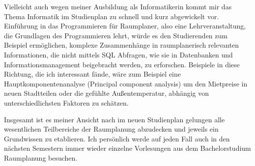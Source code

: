 \documentclass[]{article}
\begin{document}
Vielleicht auch wegen meiner Ausbildung als Informatikerin kommt mir das Thema Informatik im Studienplan zu schnell und kurz abgewickelt vor. Einführung in das Programmieren für Raumplaner, also eine Lehrveranstaltung, die Grundlagen des Programmieren lehrt, würde es den Studierenden zum Beispiel ermöglichen, komplexe Zusammenhänge in raumplanerisch relevanten Informationen, die nicht mittels SQL Abfragen, wie sie in Datenbanken und Informationsmanagement beigebracht werden, zu erforschen. Beispiele in diese Richtung, die ich interessant fände, wäre zum Beispiel eine Hauptkomponentenanalyse (Principal component analysis) um den Mietpreise in neuen Stadtteilen oder die gefühlte Außentemperatur, abhängig von unterschiedlichsten Faktoren zu schätzen.

Insgesamt ist es meiner Ansicht nach im neuen Studienplan gelungen alle wesentlichen Teilbereiche der Raumplanung abzudecken und jeweils ein Grundwissen zu etablieren. Ich persönlich werde auf jeden Fall auch in den nächsten Semestern immer wieder einzelne Vorlesungen aus dem Bachelorstudium Raumplanung besuchen.
\end{document}
